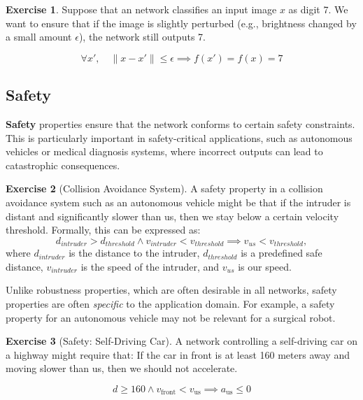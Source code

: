 \documentclass[oneside,11pt,dvipsnames]{book}
\numberwithin{equation}{section}
\theoremstyle{definition}
\newtheorem{exercise}{Exercise}[section]
\newtheorem{solutione}{Solution}[section]
\theoremstyle{remark}
\newenvironment{solution}{%
  \ifbool{showsol}{%
    \begin{solutione}%
  }{%
    \comment %
  }%
}{%
  \ifbool{showsol}{%
    \end{solutione}%
  }{%
    \endcomment %
  }%
}
\begin{document}
\begin{exercise}
Suppose that an network classifies an input image $x$ as digit 7. 
We want to ensure that if the image is slightly perturbed (e.g., brightness changed by a small amount $\epsilon$), 
the network still outputs 7.

\begin{solution}
\[
\forall x', \quad \|x - x'\| \leq \epsilon \implies f(x') = f(x) = 7
\]
\end{solution}
\end{exercise}






\subsection{Safety}\label{sec:properties-safety}


\textbf{Safety} properties ensure that the network conforms to certain safety constraints. This is particularly important in safety-critical applications, such as autonomous vehicles or medical diagnosis systems, where incorrect outputs can lead to catastrophic consequences. %

\begin{exercise}[Collision Avoidance System]\label{ex:collision-safety}
    A safety property in a collision avoidance system such as an autonomous vehicle might be that if the intruder is distant and significantly slower than us, then we stay below a certain velocity threshold. Formally, this can be expressed as:
\[
d_{intruder} > d_{threshold} \land v_{intruder} < v_{threshold} \implies v_{us} < v_{threshold},
\]
where $d_{intruder}$ is the distance to the intruder, $d_{threshold}$ is a predefined safe distance, $v_{intruder}$ is the speed of the intruder, and $v_{us}$ is our speed.
\end{exercise}


Unlike robustness properties, which are often desirable in all networks, safety properties are often \emph{specific} to the application domain. For example, a safety property for an autonomous vehicle may not be relevant for a surgical robot.



\begin{exercise}[Safety: Self-Driving Car]\label{exercise:safety}
A network controlling a self-driving car on a highway might require that:  
If the car in front is at least 160 meters away  and moving slower than us, 
then we should not accelerate.

\begin{solution}
\[
d \geq 160 \land v_{\text{front}} < v_{\text{us}} \implies a_{\text{us}} \leq 0
\]
\end{solution}
\end{exercise}
\end{document}
